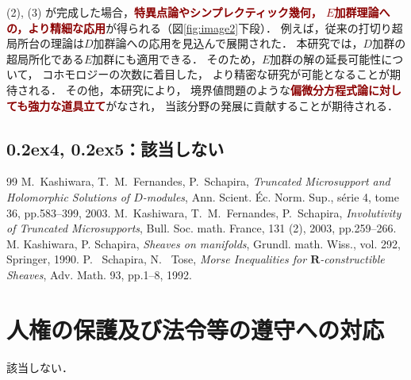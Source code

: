 \documentclass[11pt,a4paper,uplatex,dvipdfmx]{ujarticle} 		%
\newcommand{\研究課題名}{打切り超局所台の関手的性質の研究とMorse理論への応用}
\newcommand{\研究機関名}{北海道大学}
\newcommand{\研究代表者氏名}{大柴寿浩}
\newcommand{\ctext}[1]{\raise0.2ex\hbox{\textcircled{\scriptsize{#1}}}}
\begin{document}
(2), (3) が完成した場合，\textcolor{darkred}{\textbf{特異点論やシンプレクティック幾何，
\(E\)加群理論への，より精細な応用}}が得られる（図\ref{fig:image2}下段）．
例えば，従来の打切り超局所台の理論は\(D\)加群論への応用を見込んで展開された．
本研究では，\(D\)加群の超局所化である\(E\)加群にも適用できる．
そのため，\(E\)加群の解の延長可能性について，
コホモロジーの次数に着目した，
より精密な研究が可能となることが期待される．
その他，本研究により，
境界値問題のような\textcolor{darkred}{\textbf{偏微分方程式論に対しても強力な道具立て}}がなされ，
当該分野の発展に貢献することが期待される．

\vspace{-10pt}
\subsection*{\ctext{4}, \ctext{5}：該当しない}
\begin{thebibliography}{99}
		{\small
		 M.~Kashiwara, T.~M.~Fernandes, 
		P.~Schapira, 
		\textit{Truncated Microsupport and Holomorphic Solutions 
		of \(D\)-modules}, 
		Ann. Scient. \'Ec. Norm. Sup., s\'erie 4, tome 36, 
		pp.583--399, 2003.
		\vspace{-6pt}	
		 M.~Kashiwara, T.~M.~Fernandes, 
		P.~Schapira, 
		\textit{Involutivity of Truncated Microsupports}, 
		Bull. Soc. math. France, 131 (2), 2003, 
		pp.259--266.
		\vspace{-6pt}	
		 M. Kashiwara, P. Schapira, \emph{Sheaves on manifolds}, Grundl. math. Wiss., vol. 292, Springer, 1990.
		\vspace{-6pt}
		 P.~ Schapira, N.~ Tose, 
		\textit{Morse Inequalities for \(\mathbf{R}\)-constructible Sheaves}, 
		Adv. Math. 93, pp.1--8, 1992. 
		}
\end{thebibliography}
	



\section{人権の保護及び法令等の遵守への対応}

	該当しない．
\end{document}
